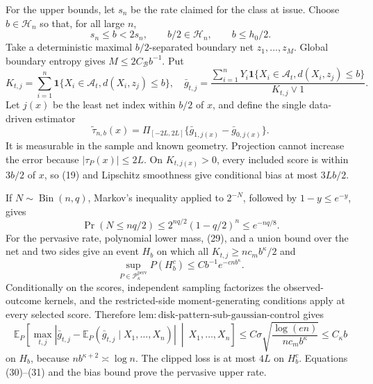 For the upper bounds, let \(s_n\) be the rate claimed for the class at
issue.  Choose \(b\in\mathcal H_n\) so that, for all large \(n\),
\[
 s_n\le b<2s_n,
 \qquad b/2\in\mathcal H_n,
 \qquad b\le h_0/2.
 \tag{27}
\]
Take a deterministic maximal \(b/2\)-separated boundary net
\(z_1,\ldots,z_M\).  Global boundary entropy gives
\(M\le2C_{\mathcal B}b^{-1}\).  Put
\[
 K_{t,j}=\sum_{i=1}^n\mathbf1\{X_i\in\mathcal A_t,
                    d(X_i,z_j)\le b\},
 \quad
 \bar g_{t,j}=\frac{\sum_{i=1}^nY_i\mathbf1\{X_i\in\mathcal A_t,
                    d(X_i,z_j)\le b\}}{K_{t,j}\vee1}.
\]
Let \(j(x)\) be the least net index within \(b/2\) of \(x\), and define
the single data-driven estimator
\[
 \widetilde\tau_{n,b}(x)=
 \Pi_{[-2L,2L]}\{\bar g_{1,j(x)}-\bar g_{0,j(x)}\}.
 \tag{28}
\]
It is measurable in the sample and known geometry.  Projection cannot
increase the error because \(|\tau_P(x)|\le2L\).  On
\(K_{t,j(x)}>0\), every included score is within \(3b/2\) of \(x\), so
(19) and Lipschitz smoothness give conditional bias at most \(3Lb/2\).

If \(N\sim\operatorname{Bin}(n,q)\), Markov's inequality applied to
\(2^{-N}\), followed by \(1-y\le e^{-y}\), gives
\[
 \Pr(N\le nq/2)\le2^{nq/2}(1-q/2)^n\le e^{-nq/8}.
 \tag{29}
\]
For the pervasive rate, polynomial lower mass, (29), and a union bound
over the net and two sides give an event \(H_b\) on which all
\(K_{t,j}\ge nc_mb^{\kappa}/2\) and
\[
 \sup_{P\in\mathcal P_{\kappa}^{\mathrm{perv}}}P(H_b^c)
 \le Cb^{-1}e^{-cnb^{\kappa}}.
 \tag{30}
\]
Conditionally on the scores, independent sampling factorizes the
observed-outcome kernels, and the restricted-side moment-generating
conditions apply at every selected score.  Therefore
\(\mathrm{lem:disk\text{-}pattern\text{-}sub\text{-}gaussian\text{-}control}\)
gives
\[
 \mathbb E_P\!\left[
 \max_{t,j}|\bar g_{t,j}-\mathbb E_P(\bar g_{t,j}\mid X_1,\ldots,X_n)|
 \ \middle|\ X_1,\ldots,X_n\right]
 \le C\sigma\sqrt{\frac{\log(en)}{nc_mb^{\kappa}}}
 \le C_{\kappa}b
 \tag{31}
\]
on \(H_b\), because \(nb^{\kappa+2}\asymp\log n\).  The clipped loss
is at most \(4L\) on \(H_b^c\).  Equations (30)--(31) and the bias bound
prove the pervasive upper rate.

